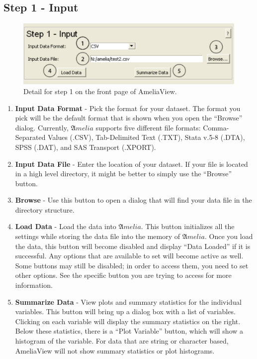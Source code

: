 \documentclass[12pt,titlepage]{article}
\begin{document}
\subsection{Step 1 - Input}
\label{sec:step1}
\begin{figure}[ht]
  \centering
  \includegraphics[scale=.75]{step1}
  \caption{Detail for step 1 on the front page of AmeliaView.}
\end{figure}
\begin{enumerate}
\item \textbf{Input Data Format} - Pick the format for your dataset.  The format you pick will be the default format that is shown when you open the ``Browse'' dialog.  Currently, ${\mathfrak Amelia}$ supports five different file formats: Comma-Separated Values (.CSV), Tab-Delimited Text (.TXT), Stata v.5-8 (.DTA), SPSS (.DAT), and SAS Transport (.XPORT).  
\item \textbf{Input Data File} - Enter the location of your dataset.  If your file is located in a high level directory, it might be better to simply use the ``Browse'' button.  
\item \textbf{Browse} - Use this button to open a dialog that will find your data file in the directory structure.  
\item \textbf{Load Data} - Load the data into ${\mathfrak Amelia}$.  This button initializes all the settings while storing the data file into the memory of ${\mathfrak Amelia}$.  Once you load the data, this button will become disabled and display ``Data Loaded'' if it is successful.  Any options that are available to set will become active as well.  Some buttons may still be disabled;  in order to access them, you need to set other options.  See the specific button you are trying to access for more information.  
\item \textbf{Summarize Data} - View plots and summary statistics for the individual variables.  This button will bring up a dialog box with a list of variables.  Clicking on each variable will display the summary statistics on the right.  Below these statistics, there is a ``Plot Variable'' button, which will show a histogram of the variable.  For data that are string or character based, AmeliaView will not show summary statistics or plot histograms.
\end{enumerate}
\end{document}
